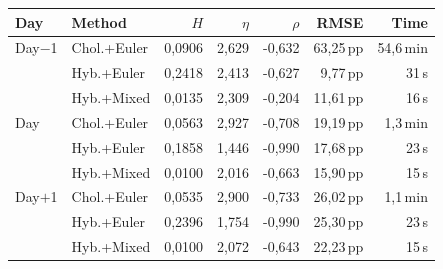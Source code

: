 \begin{tabular}{l l r r r r r}
  \toprule
  \textbf{Day} & \textbf{Method} & \textbf{$H$} & \textbf{$\eta$} & \textbf{$\rho$} & \textbf{RMSE} & \textbf{Time} \\
  \midrule
  Day$-$1 & Chol.+Euler & 0,0906 & 2,629 & -0,632 & 63,25\,pp & 54,6\,min \\
   & Hyb.+Euler & 0,2418 & 2,413 & -0,627 & 9,77\,pp & 31\,s \\
   & Hyb.+Mixed & 0,0135 & 2,309 & -0,204 & 11,61\,pp & 16\,s \\
  \addlinespace[3pt]
  Day & Chol.+Euler & 0,0563 & 2,927 & -0,708 & 19,19\,pp & 1,3\,min \\
   & Hyb.+Euler & 0,1858 & 1,446 & -0,990 & 17,68\,pp & 23\,s \\
   & Hyb.+Mixed & 0,0100 & 2,016 & -0,663 & 15,90\,pp & 15\,s \\
  \addlinespace[3pt]
  Day$+$1 & Chol.+Euler & 0,0535 & 2,900 & -0,733 & 26,02\,pp & 1,1\,min \\
   & Hyb.+Euler & 0,2396 & 1,754 & -0,990 & 25,30\,pp & 23\,s \\
   & Hyb.+Mixed & 0,0100 & 2,072 & -0,643 & 22,23\,pp & 15\,s \\
  \bottomrule
\end{tabular}